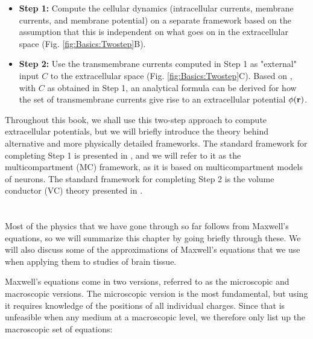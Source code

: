 \begin{itemize}
\item {\bf Step 1:} Compute the cellular dynamics (intracellular currents, membrane currents, and membrane potential) on a separate framework based on the assumption that this is independent on what goes on in the extracellular space (Fig. \ref{fig:Basics:Twostep}B).

\item {\bf Step 2:} Use the transmembrane currents computed in Step 1 as "external" input $C$ to the extracellular space (Fig. \ref{fig:Basics:Twostep}C). Based on , with $C$ as obtained in Step 1, an analytical formula can be derived for how the set of transmembrane currents give rise to an extracellular potential $\phi({\bf r})$.
\end{itemize}

Throughout this book, we shall use this two-step approach to compute extracellular potentials, but we will briefly introduce the theory behind alternative and more physically detailed frameworks. The standard framework for completing Step 1 is presented in , and we will refer to it as the multicompartment (MC) framework, as it is based on multicompartment models of neurons. The standard framework for completing Step 2 is the volume conductor (VC) theory presented in  .


\section{}
\label{sec:Basics:Maxwell} 
Most of the physics that we have gone through so far follows from Maxwell's equations, so we will summarize this chapter by going briefly through these. We will also discuss some of the approximations of Maxwell's equations that we use when applying them to studies of brain tissue.

Maxwell's equations come in two versions, referred to as the microscopic and macroscopic versions. The microscopic version is the most fundamental, but using it requires knowledge of the positions of all individual charges. Since that is unfeasible when any medium at a macroscopic level, we therefore only list up the macroscopic set of equations:

